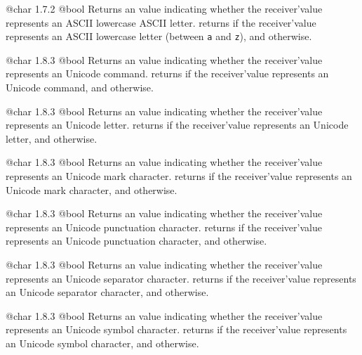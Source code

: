 {@char}
{1.7.2}
{@bool}
{Returns an  value indicating whether the receiver'value represents an ASCII lowercase ASCII letter.}
{returns  if the receiver'value represents an ASCII lowercase letter (between \texttt{\textquotesingle a\textquotesingle} and \texttt{\textquotesingle z\textquotesingle}), and  otherwise.}






{@char}
{1.8.3}
{@bool}
{Returns an  value indicating whether the receiver'value represents an Unicode command.}
{returns  if the receiver'value represents an Unicode command, and  otherwise.}






{@char}
{1.8.3}
{@bool}
{Returns an  value indicating whether the receiver'value represents an Unicode letter.}
{returns  if the receiver'value represents an Unicode letter, and  otherwise.}






{@char}
{1.8.3}
{@bool}
{Returns an  value indicating whether the receiver'value represents an Unicode mark character.}
{returns  if the receiver'value represents an Unicode mark character, and  otherwise.}






{@char}
{1.8.3}
{@bool}
{Returns an  value indicating whether the receiver'value represents an Unicode punctuation character.}
{returns  if the receiver'value represents an Unicode punctuation character, and  otherwise.}






{@char}
{1.8.3}
{@bool}
{Returns an  value indicating whether the receiver'value represents an Unicode separator character.}
{returns  if the receiver'value represents an Unicode separator character, and  otherwise.}






{@char}
{1.8.3}
{@bool}
{Returns an  value indicating whether the receiver'value represents an Unicode symbol character.}
{returns  if the receiver'value represents an Unicode symbol character, and  otherwise.}









